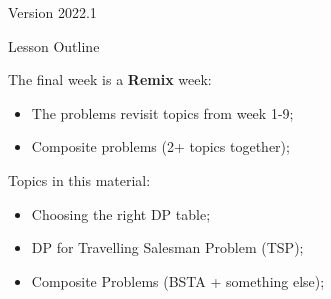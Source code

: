 \documentclass[aspectratio=169]{beamer}
\subtitle[Week 10: Problem Remix]{Week 10 - Final Problem Remix}
\date{{\smaller(last updated: \today)}}
\begin{document}
\begin{CJK}{UTF8}{ipxm}

\begin{frame}
\maketitle
\vfill

\hfill Version 2022.1
\end{frame}

\begin{frame}[t]{Lesson Outline}

  The final week is a {\bf Remix} week:
  \begin{itemize}
    \item The problems revisit topics from week 1-9;
    \item Composite problems (2+ topics together);
  \end{itemize}\bigskip

  Topics in this material:
  \begin{itemize}
    \item Choosing the right DP table;
    \item DP for Travelling Salesman Problem (TSP);
    \item Composite Problems (BSTA + something else);
  \end{itemize}
\end{frame}









\end{CJK}
\end{document}
